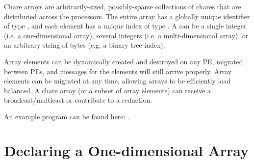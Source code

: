 \label{basic arrays}

Chare arrays are
arbitrarily-sized, possibly-sparse collections of chares that are distributed
across the processors. The entire array has a globally unique identifier of
type , and each element has a unique index of type
. A  can be a single integer (i.e. a one-dimensional array),
several integers (i.e. a multi-dimensional array), or an arbitrary string of
bytes (e.g. a binary tree index).

Array elements can be dynamically created and destroyed on any PE,
migrated between PEs, and messages for the elements will still arrive
properly. Array elements can be migrated at any time, allowing arrays to be
efficiently load balanced. A chare array (or a subset of array elements) can
receive a broadcast/multicast or contribute to a reduction.

An example program can be found here: .

\section{Declaring a One-dimensional Array}

